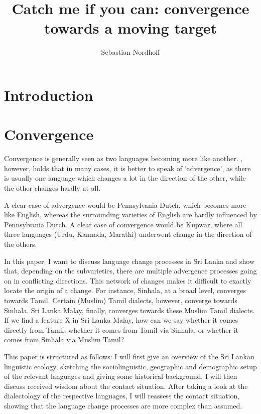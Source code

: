 \documentclass[handout,utf8]{article}
\title{Catch me if you can: convergence towards a moving target}
\author{Sebastian Nordhoff}
\begin{document}
\maketitle
 
\begin{abstract}
 
\end{abstract}

\section{Introduction}

\section{Convergence}
Convergence is generally seen as two languages becoming more like another. \citet{Mattheier1996}, however, holds that in many cases, it is better to speak of `advergence', as there is usually one language which changes a lot in the direction of the other, while the other changes hardly at all. 

A clear case of advergence would be Pennsylvania Dutch, which becomes more like English, whereas the surrounding varieties of English are hardly influenced by Pennsylvania Dutch. A clear case of convergence would be Kupwar, where all three languages (Urdu, Kannada, Marathi) underwent change in the direction of the others. 

In this paper, I want to discuss language change processes in Sri Lanka and show that, depending on the subvarieties,  there are multiple advergence processes going on in conflicting directions. This network of changes makes it difficult to exactly locate the origin of a change. For instance, Sinhala, at a broad level, converges towards Tamil. Certain (Muslim) Tamil dialects, however, converge towards Sinhala. Sri Lanka Malay, finally, converges towards these Muslim Tamil dialects. If we find  a feature X in Sri Lanka Malay, how can we say whether it comes directly from Tamil, whether it comes from Tamil via Sinhala, or whether it comes from Sinhala via Muslim Tamil? 

This paper is structured as follows: I will first give an overview of the Sri Lankan linguistic ecology, sketching the sociolinguistic, geographic and demographic setup of the relevant languages and giving some historical background. I will then discuss received wisdom about the contact situation. After taking a look at the dialectology of the respective languages, I will reassess the contact situation, showing that the language change processes are more complex than assumed. 
\end{document}
